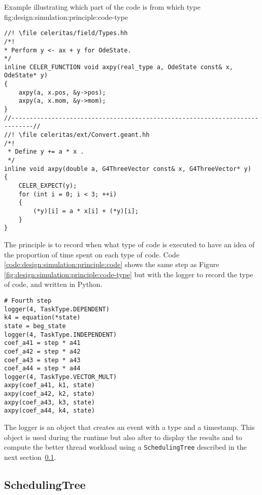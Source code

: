         {Example illustrating which part of the code is from which type}
        {fig:design:simulation:principle:code-type}

\begin{code}
    \label{code:design:simulation:principle:axpy}
    \begin{verbatim}
//! \file celeritas/field/Types.hh
/*!
* Perform y <- ax + y for OdeState.
*/
inline CELER_FUNCTION void axpy(real_type a, OdeState const& x, OdeState* y)
{
    axpy(a, x.pos, &y->pos);
    axpy(a, x.mom, &y->mom);
}
//----------------------------------------------------------------------------//
//! \file celeritas/ext/Convert.geant.hh
/*!
 * Define y += a * x .
 */
inline void axpy(double a, G4ThreeVector const& x, G4ThreeVector* y)
{
    CELER_EXPECT(y);
    for (int i = 0; i < 3; ++i)
    {
        (*y)[i] = a * x[i] + (*y)[i];
    }
}
    \end{verbatim}
\end{code}

The principle is to record when what type of code is executed to have an idea of
the proportion of time spent on each type of code.
Code \ref{code:design:simulation:principle:code} shows the same step as
Figure \ref{fig:design:simulation:principle:code-type} but with the
logger to record the type of code, and written in Python.

\begin{code}
    \label{code:design:simulation:principle:code}
    \begin{verbatim}
# Fourth step
logger(4, TaskType.DEPENDENT)
k4 = equation(*state)
state = beg_state
logger(4, TaskType.INDEPENDENT)
coef_a41 = step * a41
coef_a42 = step * a42
coef_a43 = step * a43
coef_a44 = step * a44
logger(4, TaskType.VECTOR_MULT)
axpy(coef_a41, k1, state)
axpy(coef_a42, k2, state)
axpy(coef_a43, k3, state)
axpy(coef_a44, k4, state)
    \end{verbatim}
\end{code}

The logger is an object that creates an event with a type and a timestamp.
This object is used during the runtime but also after to display the results and
to compute the better thread workload using a \texttt{SchedulingTree} described
in the next section~\ref{ch:design:simulation:scheduling}.

\subsection{SchedulingTree}
\label{ch:design:simulation:scheduling}

